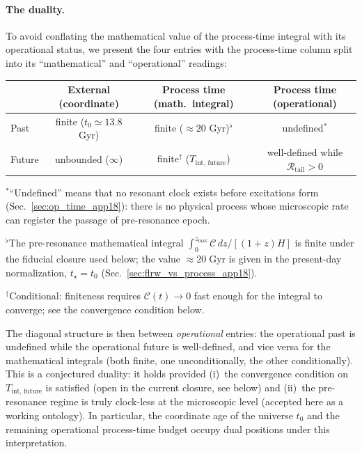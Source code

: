\documentclass[11pt]{article}
\begin{document}
\paragraph{The duality.}
To avoid conflating the mathematical value of the process-time
integral with its operational status, we present the four entries with
the process-time column split into its ``mathematical'' and
``operational'' readings:
\begin{center}
\renewcommand{\arraystretch}{1.4}
\begin{tabular}{@{}lccc@{}}
\toprule
  & External (coordinate) & Process time (math.\ integral) & Process time (operational) \\
\midrule
Past   & finite ($t_0\simeq 13.8$ Gyr)
       & finite ($\approx 20$ Gyr)$^{\flat}$
       & undefined$^{*}$ \\
Future & unbounded ($\infty$)
       & finite$^{\dagger}$ ($T_{\mathrm{int,\,future}}$)
       & well-defined while $\mathcal{R}_{\mathrm{tail}}>0$ \\
\bottomrule
\end{tabular}
\end{center}
\noindent
{\footnotesize $^{*}$``Undefined'' means that no resonant clock exists
before excitations form (Sec.~\ref{sec:op_time_app18}): there is no
physical process whose microscopic rate can register the passage of
pre-resonance epoch.\par
$^{\flat}$The pre-resonance mathematical integral
$\int_0^{z_{\max}}\mathcal{C}\,dz/[(1{+}z)H]$ is finite under the
fiducial closure used below; the value $\approx 20\;\mathrm{Gyr}$ is
given in the present-day normalization, $t_\star=t_0$
(Sec.~\ref{sec:flrw_vs_process_app18}).\par
$^{\dagger}$Conditional: finiteness requires $\mathcal{C}(t)\to 0$
fast enough for the integral to converge; see the convergence
condition below.}

\medskip\noindent
The diagonal structure is then between \emph{operational} entries:
the operational past is undefined while the operational future is
well-defined, and vice versa for the mathematical integrals (both
finite, one unconditionally, the other conditionally).  This is a
conjectured duality: it holds provided (i)~the convergence condition
on $T_{\mathrm{int,\,future}}$ is satisfied (open in the current
closure, see below) and (ii)~the pre-resonance regime is truly
clock-less at the microscopic level (accepted here as a working
ontology).  In particular, the coordinate age of the universe $t_0$
and the remaining operational process-time budget occupy dual
positions under this interpretation.
\end{document}
